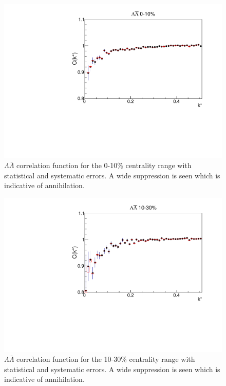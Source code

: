 \begin{figure}[hbt]
\includegraphics[width=36pc]{Figures/CFs/2016-8-30-CFLamALam010CombinedSystematicsMaximum.pdf}
\caption[$\Lambda\bar{\Lambda}$ correlation function for the 0-10\% centrality range]{$\Lambda\bar{\Lambda}$ correlation function for the 0-10\% centrality range with statistical and systematic errors.  
A wide suppression is seen which is indicative of annihilation.}
\label{fig:CFLamALam010}
\end{figure}
\begin{figure}[hbt]
\includegraphics[width=36pc]{Figures/CFs/2016-8-30-CFLamALam1030CombinedSystematicsMaximum.pdf}
\caption[$\Lambda\bar{\Lambda}$ correlation function for the 10-30\% centrality range]{$\Lambda\bar{\Lambda}$ correlation function for the 10-30\% centrality range with statistical and systematic errors.  
A wide suppression is seen which is indicative of annihilation.}
\label{fig:CFLamALam1030}
\end{figure}
